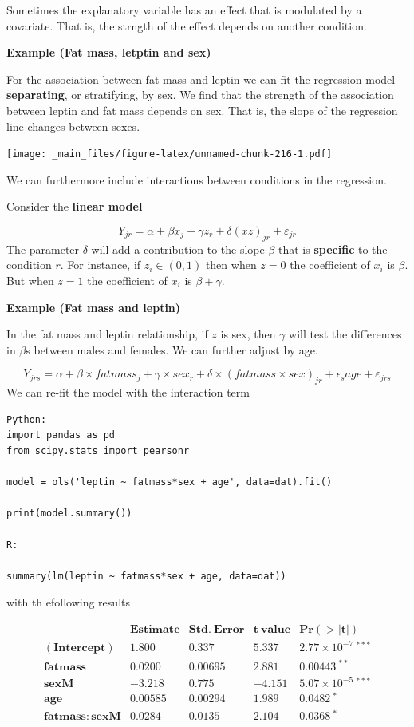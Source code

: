 \documentclass[
]{book}
\begin{document}
Sometimes the explanatory variable has an effect that is modulated by a covariate. That is, the strngth of the effect depends on another condition.

\textbf{Example (Fat mass, letptin and sex)}

For the association between fat mass and leptin we can fit the regression model \textbf{separating}, or stratifying, by sex. We find that the strength of the association between leptin and fat mass depends on sex. That is, the slope of the regression line changes between sexes.

\texttt{[image: \_main\_files/figure-latex/unnamed-chunk-216-1.pdf]}

We can furthermore include interactions between conditions in the regression.

Consider the \textbf{linear model}

\[Y_{jr} = \alpha + \beta x_{j} +\gamma z_{r} + \delta (xz)_{jr} +\varepsilon_{jr}\]
The parameter \(\delta\) will add a contribution to the slope \(\beta\) that is \textbf{specific} to the condition \(r\). For instance, if \(z_i \in (0,1)\) then when \(z=0\) the coefficient of \(x_i\) is \(\beta\). But when \(z=1\) the coefficient of \(x_i\) is \(\beta+\gamma\).

\textbf{Example (Fat mass and leptin)}

In the fat mass and leptin relationship, if \(z\) is sex, then \(\gamma\) will test the differences in \(\beta\)s between males and females. We can further adjust by age.

\[Y_{jrs} = \alpha + \beta\times fatmass_{j} +\gamma\times sex_{r} + \delta\times (fatmass\times sex)_{jr} + \epsilon_s age+\varepsilon_{jrs}\]
We can re-fit the model with the interaction term

\begin{verbatim}
Python:
import pandas as pd
from scipy.stats import pearsonr

model = ols('leptin ~ fatmass*sex + age', data=dat).fit()

print(model.summary())

R:

summary(lm(leptin ~ fatmass*sex + age, data=dat))
\end{verbatim}

with th efollowing results

\[
\begin{array}{lcccc}
 & \mathbf{Estimate} & \mathbf{Std.\ Error} & \mathbf{t\ value} & \mathbf{Pr(>|t|)} \\ 
\mathbf{(Intercept)} & 1.800 & 0.337 & 5.337 & 2.77 \times 10^{-7} \ ^{***} \\
\mathbf{fatmass}     & 0.0200 & 0.00695 & 2.881 & 0.00443 \ ^{**} \\
\mathbf{sexM}        & -3.218 & 0.775 & -4.151 & 5.07 \times 10^{-5} \ ^{***} \\
\mathbf{age}         & 0.00585 & 0.00294 & 1.989 & 0.0482 \ ^{*} \\
\mathbf{fatmass{:}sexM} & 0.0284 & 0.0135 & 2.104 & 0.0368 \ ^{*} \\
\end{array}
\]
\end{document}
